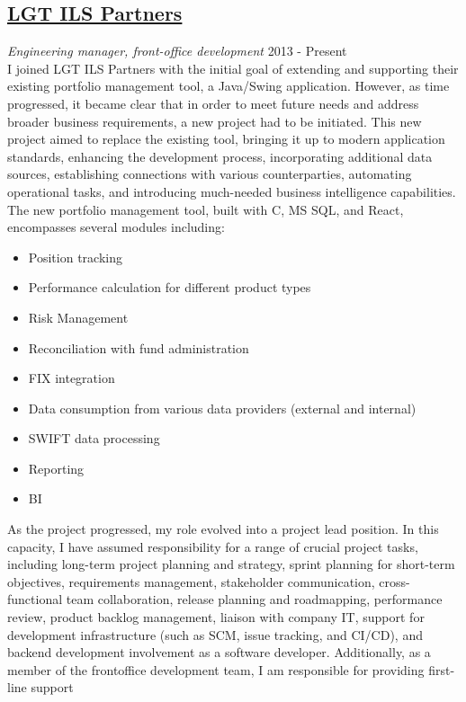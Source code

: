 \documentclass[margin, 10pt]{res}
\begin{document}
\begin{resume}
\section{\href{http://lgtcp.com}{LGT ILS Partners}}
{\sl Engineering manager, front-office development} \hfill 2013 - Present \\
I joined LGT ILS Partners with the initial goal of extending and supporting their existing portfolio management tool, a Java/Swing application. However, as time progressed, it became clear that in order to meet future needs and address broader business requirements, a new project had to be initiated. This new project aimed to replace the existing tool, bringing it up to modern application standards, enhancing the development process, incorporating additional data sources, establishing connections with various counterparties, automating operational tasks, and introducing much-needed business intelligence capabilities. The new portfolio management tool, built with C, MS SQL, and React, encompasses several modules including: 
\begin{itemize}
\item Position tracking  
\item Performance calculation for different product types 
\item Risk Management 
\item Reconciliation with fund administration
\item FIX integration
\item Data consumption from various data providers (external and internal)
\item SWIFT data processing 
\item Reporting
\item BI
\end{itemize} 

 As the project progressed, my role evolved into a project lead position. In this capacity, I have assumed responsibility for a range of crucial project tasks, including long-term project planning and strategy, sprint planning for short-term objectives, requirements management, stakeholder communication, cross-functional team collaboration, release planning and roadmapping, performance review, product backlog management, liaison with company IT, support for development infrastructure (such as SCM, issue tracking, and CI/CD), and backend development involvement as a software developer. Additionally, as a member of the frontoffice development team, I am responsible for providing first-line support


\end{resume}
\end{document}
